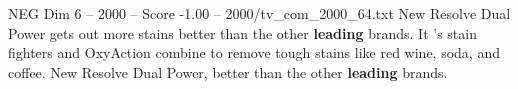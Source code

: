 \begin{textsample}{NEG Dim 6 – 2000 – Score -1.00 – 2000/tv\_com\_2000\_64.txt}  \label{ex:f6_neg_020}
New Resolve Dual Power gets out more stains better than the other \textbf{leading} brands.
It 's stain fighters and OxyAction combine to remove tough stains like red wine, soda, and coffee.
New Resolve Dual Power, better than the other \textbf{leading} brands.

\end{textsample}
